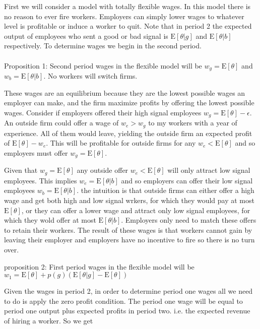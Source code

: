 \documentclass[11pt]{article}
\newcommand{\E}{\mathrm{E}}
\begin{document}
First we will consider a model with totally flexible wages. In this model there is no reason to ever fire workers. Employers can simply lower wages to whatever level is profitable or induce a worker to quit. Note that in period 2 the expected output of employees who sent a good or bad signal is $\E[\theta|g]$ and $\E[\theta|b]$ respectively. To determine wages we begin in the second period. \\~\\

Proposition 1: Second period wages in the flexible model will be $w_g = \E[\theta]$ and $w_b = \E[\theta|b]$. No workers will switch firms.

These wages are an equilibrium because they are the lowest possible wages an employer can make, and the firm maximize profits by offering the lowest possible wages. Consider if employers offered their high signal employees $w_g = \E[\theta] - \epsilon$. An outside firm could offer a wage of $w_e > w_g$ to my workers with a year of experience. All of them would leave, yielding the outside firm an expected profit of $\E[\theta] - w_e $. This will be profitable for outside firms for any $w_e < \E[\theta]$ and so employers must offer $w_g = \E[\theta]$. \par 

Given that $w_g = \E[\theta]$ any outside offer $w_e < \E[\theta]$ will only attract low signal employees. This implies $w_e = \E[\theta|b]$ and so employers can offer their low signal employees $w_b = \E[\theta|b]$. the intuition is that outside firms can either offer a high wage and get both high and low signal wrkers, for which they would pay at most $\E[\theta]$, or they can offer a lower wage and attract only low signal employees, for which they wold offer at most $\E[\theta|b]$. Employers only need to match these offers to retain their workers. The result of these wages is that workers cannot gain by leaving their employer and employers have no incentive to fire so there is no turn over. \par

proposition 2: First period wages in the flexible model will be $w_1 = \E[\theta] + p(g)(\E[\theta|g] - \E[\theta])$

Given the wages in period 2, in order to determine period one wages all we need to do is apply the zero profit condition. The period one wage will be equal to period one output plus expected profits in period two. i.e. the expected revenue of hiring a worker. So we get 
\end{document}
